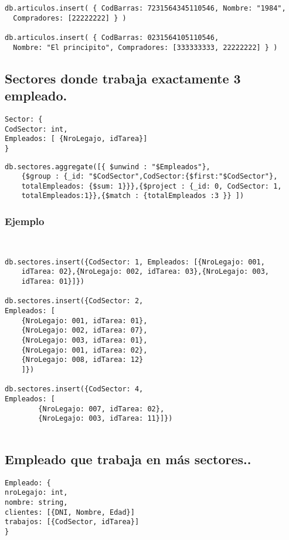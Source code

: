 \begin{lstlisting}
db.articulos.insert( { CodBarras: 7231564345110546, Nombre: "1984",
  Compradores: [22222222] } )

db.articulos.insert( { CodBarras: 0231564105110546,
  Nombre: "El principito", Compradores: [333333333, 22222222] } )
\end{lstlisting}


\subsection{Sectores donde trabaja exactamente 3 empleado.}

\begin{lstlisting}
Sector: {
CodSector: int,
Empleados: [ {NroLegajo, idTarea}]
}

\end{lstlisting}

\begin{lstlisting}
db.sectores.aggregate([{ $unwind : "$Empleados"}, 
	{$group : {_id: "$CodSector",CodSector:{$first:"$CodSector"}, 
	totalEmpleados: {$sum: 1}}},{$project : {_id: 0, CodSector: 1,
	totalEmpleados:1}},{$match : {totalEmpleados :3 }} ])
\end{lstlisting}

\subsubsection{Ejemplo}
\begin{lstlisting}


db.sectores.insert({CodSector: 1, Empleados: [{NroLegajo: 001, 
	idTarea: 02},{NroLegajo: 002, idTarea: 03},{NroLegajo: 003, 
	idTarea: 01}]})

db.sectores.insert({CodSector: 2, 
Empleados: [
	{NroLegajo: 001, idTarea: 01},
	{NroLegajo: 002, idTarea: 07},
	{NroLegajo: 003, idTarea: 01},
	{NroLegajo: 001, idTarea: 02},
	{NroLegajo: 008, idTarea: 12}
	]})

db.sectores.insert({CodSector: 4, 
Empleados: [
		{NroLegajo: 007, idTarea: 02},	
		{NroLegajo: 003, idTarea: 11}]})


\end{lstlisting}

\subsection{Empleado que trabaja en más sectores..}

\begin{lstlisting}
Empleado: {
nroLegajo: int,
nombre: string,
clientes: [{DNI, Nombre, Edad}]
trabajos: [{CodSector, idTarea}]
}

\end{lstlisting}


